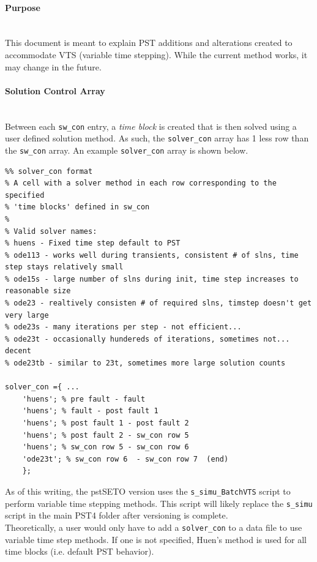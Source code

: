 \documentclass[12pt]{article}
\begin{document}
\onehalfspacing
\paragraph{Purpose} \ \\
This document is meant to explain PST additions and alterations created to accommodate VTS (variable time stepping).
While the current method works, it may change in the future.

\paragraph{Solution Control Array} \ \\
Between each \verb|sw_con| entry, a \emph{time block} is created that is then solved using a user defined solution method.
As such, the \verb|solver_con| array has 1 less row than the \verb|sw_con| array.
An example \verb|solver_con| array is shown below.
\begin{verbatim}
%% solver_con format
% A cell with a solver method in each row corresponding to the specified
% 'time blocks' defined in sw_con
%
% Valid solver names:
% huens - Fixed time step default to PST
% ode113 - works well during transients, consistent # of slns, time step stays relatively small
% ode15s - large number of slns during init, time step increases to reasonable size
% ode23 - realtively consisten # of required slns, timstep doesn't get very large
% ode23s - many iterations per step - not efficient...
% ode23t - occasionally hundereds of iterations, sometimes not... decent
% ode23tb - similar to 23t, sometimes more large solution counts

solver_con ={ ...
    'huens'; % pre fault - fault
    'huens'; % fault - post fault 1
    'huens'; % post fault 1 - post fault 2
    'huens'; % post fault 2 - sw_con row 5
    'huens'; % sw_con row 5 - sw_con row 6 
    'ode23t'; % sw_con row 6  - sw_con row 7  (end)
    };
\end{verbatim}

As of this writing, the pstSETO version uses the \verb|s_simu_BatchVTS| script to perform variable time stepping methods.
This script will likely replace the \verb|s_simu| script in the main PST4 folder after versioning is complete.\\

Theoretically, a user would only have to add a \verb|solver_con| to a data file to use variable time step methods.
If one is not specified, Huen's method is used for all time blocks (i.e. default PST behavior).
\end{document}
